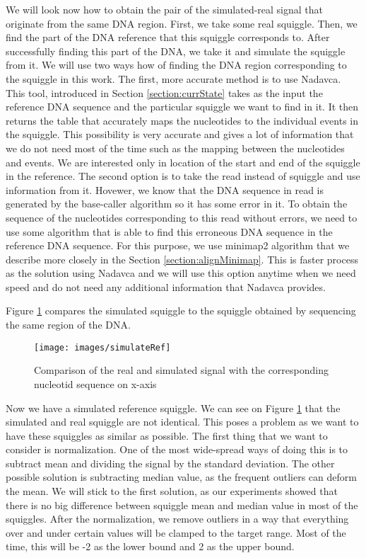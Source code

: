 We will look now how to obtain the pair of the simulated-real signal that originate
from the same DNA region. First, we take some real squiggle.
Then, we find the part of the DNA reference that this squiggle corresponds to. After
successfully finding this part of the DNA, we take it and simulate the squiggle from it. We will use
two ways how of finding the DNA region corresponding to the squiggle in this work. The first, more accurate method is to
use Nadavca. This tool, introduced in Section \ref{section:currState} takes
as the input the reference DNA sequence and the particular squiggle we want to find
in it. It then returns the table that accurately maps the nucleotides to the individual
events in the squiggle. This possibility is very accurate and gives a lot of information
that we do not need most of the time such as the mapping between the nucleotides
and events. We are interested only in location of the start and end of the squiggle
in the reference. The second option is to take the read instead of squiggle and use information from it.
Hovewer, we know that the DNA sequence in read is generated by the base-caller algorithm so it has some error
in it. To obtain the sequence of the nucleotides corresponding to this read without
errors, we need to use some algorithm that is able to find this erroneous DNA
sequence in the reference DNA sequence. For this purpose, we use minimap2 algorithm
that we describe more closely in the Section \ref{section:alignMinimap}. This is faster
process as the solution using Nadavca and we will use this option anytime when we need
speed and do not need any additional information that Nadavca provides.

Figure \ref{obr:simVsReal} compares the simulated squiggle to the squiggle obtained
by sequencing the same region of the DNA.

\begin{figure}
\centerline{\texttt{[image: images/simulateRef]}}
\caption[TODO]{Comparison of the real and simulated signal with the corresponding nucleotid sequence on x-axis}
\label{obr:simVsReal}
\end{figure}

Now we have a simulated reference squiggle. We can see on Figure \ref{obr:simVsReal} that the simulated and real
squiggle are not identical. This poses a problem as we want to have these squiggles as
similar as possible. The first thing that we want to consider is normalization.
One of the most wide-spread ways of doing this is to subtract mean and dividing
the signal by the standard deviation. The other possible solution is subtracting median value,
as the frequent outliers can deform the mean. We will stick to the first solution,
as our experiments showed that there is no big difference between squiggle mean
and median value in most of the squiggles.
After the normalization, we remove outliers in a way that everything over and under certain values will
be clamped to the target range. Most of the time, this will be -2 as the lower bound
and 2 as the upper bound.

